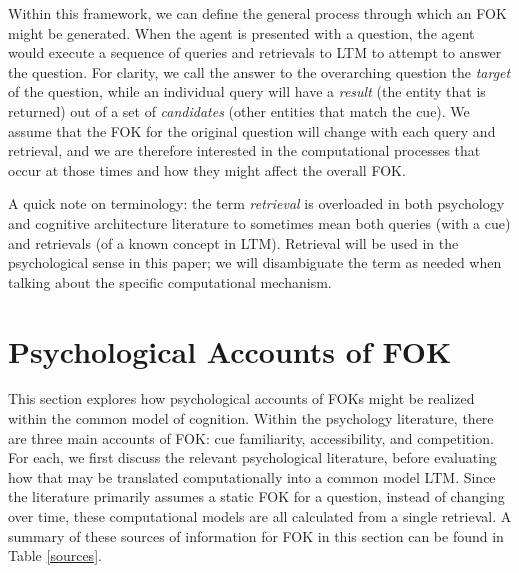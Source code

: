 \documentclass[10pt,letterpaper]{article}
\begin{document}
Within this framework, we can define the general process through which an FOK might be generated.
When the agent is presented with a question, the agent would execute a sequence of queries and retrievals to LTM to attempt to answer the question.
For clarity, we call the answer to the overarching question the \textit{target} of the question, while an individual query will have a \textit{result} (the entity that is returned) out of a set of \textit{candidates} (other entities that match the cue).
We assume that the FOK for the original question will change with each query and retrieval, and we are therefore interested in the computational processes that occur at those times and how they might affect the overall FOK.

A quick note on terminology: the term \textit{retrieval} is overloaded in both psychology and cognitive architecture literature to sometimes mean both queries (with a cue) and retrievals (of a known concept in LTM).
Retrieval will be used in the psychological sense in this paper; we will disambiguate the term as needed when talking about the specific computational mechanism.


\section{Psychological Accounts of FOK}

This section explores how psychological accounts of FOKs might be realized within the common model of cognition.
Within the psychology literature, there are three main accounts of FOK: cue familiarity, accessibility, and competition.
For each, we first discuss the relevant psychological literature, before evaluating how that may be translated computationally into a common model LTM.
Since the literature primarily assumes a static FOK for a question, instead of changing over time, these computational models are all calculated from a single retrieval.
A summary of these sources of information for FOK in this section can be found in Table \ref{sources}.
\end{document}
